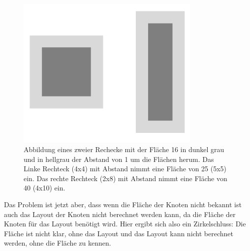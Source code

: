 \begin{figure}
    \centering
    \includegraphics[width=0.8\textwidth]{images/marginArea.png}
    \caption{Abbildung eines zweier Rechecke mit der Fläche 16 in dunkel grau und in hellgrau der Abstand von 1 um die Flächen herum. Das Linke Rechteck (4x4) mit Abstand nimmt eine Fläche von 25 (5x5) ein. Das rechte Rechteck (2x8) mit Abstand nimmt eine Fläche von 40 (4x10) ein.}
    \label{fig:marginAreaDifference}
\end{figure}

Das Problem ist jetzt aber, dass wenn die Fläche der Knoten nicht bekannt ist auch das Layout der Knoten nicht berechnet werden kann, da die Fläche der Knoten für das Layout benötigt wird. Hier ergibt sich also ein Zirkelschluss: Die Fläche ist nicht klar, ohne das Layout und das Layout kann nicht berechnet werden, ohne die Fläche zu kennen.
